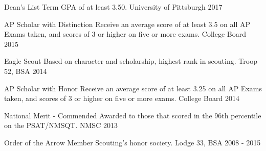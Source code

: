

\begin{cvhonors}

  \cvhonor
    {Dean's List} %
    {Term GPA of at least 3.50.} %
    {University of Pittsburgh} %
    {2017} %

  \cvhonor
    {AP Scholar with Distinction} %
    {Receive an average score of at least 3.5 on all AP Exams taken, and scores of 3 or higher on five or more exams.} %
    {College Board} %
    {2015} %

  \cvhonor
    {Eagle Scout} %
    {Based on character and scholarship, highest rank in scouting.} %
    {Troop 52, BSA} %
    {2014} %

  \cvhonor
    {AP Scholar with Honor} %
    {Receive an average score of at least 3.25 on all AP Exams taken, and scores of 3 or higher on five or more exams.} %
    {College Board} %
    {2014} %

  \cvhonor
    {National Merit - Commended} %
    {Awarded to those that scored in the 96th percentile on the PSAT/NMSQT.} %
    {NMSC} %
    {2013} %

  \cvhonor
    {Order of the Arrow Member} %
    {Scouting’s honor society.} %
    {Lodge 33, BSA} %
    {2008 - 2015} %

\end{cvhonors}
